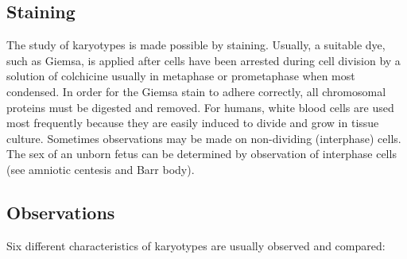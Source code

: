 \documentclass[]{book}
\begin{document}
\subsection{Staining}\label{staining}

The study of karyotypes is made possible by staining. Usually, a
suitable dye, such as Giemsa, is applied after cells have been arrested
during cell division by a solution of colchicine usually in metaphase or
prometaphase when most condensed. In order for the Giemsa stain to
adhere correctly, all chromosomal proteins must be digested and removed.
For humans, white blood cells are used most frequently because they are
easily induced to divide and grow in tissue culture. Sometimes
observations may be made on non-dividing (interphase) cells. The sex of
an unborn fetus can be determined by observation of interphase cells
(see amniotic centesis and Barr body).

\subsection{Observations}\label{observations}

Six different characteristics of karyotypes are usually observed and
compared:
\end{document}
